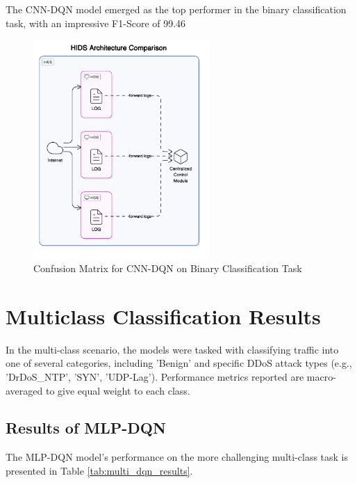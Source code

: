 \documentclass{report}
\begin{document}
The CNN-DQN model emerged as the top performer in the binary classification task, with an impressive F1-Score of 99.46%

\begin{figure}[H]
    \centering
    \includegraphics[width=0.6\textwidth]{images/hids-diagram.png} %
    \caption{Confusion Matrix for CNN-DQN on Binary Classification Task}
    \label{fig:cnn_binary_cm}
\end{figure}

\section{Multiclass Classification Results}
In the multi-class scenario, the models were tasked with classifying traffic into one of several categories, including 'Benign' and specific DDoS attack types (e.g., 'DrDoS\_NTP', 'SYN', 'UDP-Lag'). Performance metrics reported are macro-averaged to give equal weight to each class.

\subsection{Results of MLP-DQN}
The MLP-DQN model's performance on the more challenging multi-class task is presented in Table \ref{tab:multi_dqn_results}.
\end{document}
